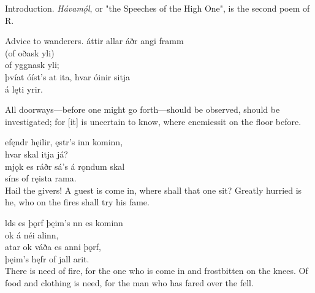 \bookStart

	Introduction.
\small{\emph{Hávamǫ́l}, or "the Speeches of the High One\footnotemark[1]", is the second poem of R.}

	Advice to wanderers.
\bva {}áttir allar \hld áðr angi framm \\%
\ind (of oðask yli)\footnotemark[2] \\%
\ind of yggnask yli; \\%
þvíat óíst's at ita, \hld hvar óinir sitja\footnotemark[3] \\%
\ind á lęti yrir.\\%

\bvb All doorways—before one might go forth—should be observed, should be investigated; for [it] is uncertain to know, where enemies\footnotemark[1] sit on the floor before. \\		

\bva {}efęndr hęilir, \hld {}ęstr's inn kominn, \\%
\ind hvar skal itja já? \\%
mjǫk es ráðr \hld sá's á rǫndum skal \\%
\ind síns of ręista rama.\\%

\bvb Hail the givers\footnotemark[5]! A guest is come in, where shall that one sit? Greatly hurried is he, who on the fires shall try his fame. \\

\bva {}lds es þǫrf \hld þęim's nn es kominn \\%
\ind ok á néi alinn, \\%
atar ok váða \hld es anni þǫrf, \\%
\ind þęim's hęfr of jall arit.\\%

\bvb There is need of fire, for the one who is come in and frostbitten on the knees. Of food and clothing is need, for the man who has fared over the fell. \\


